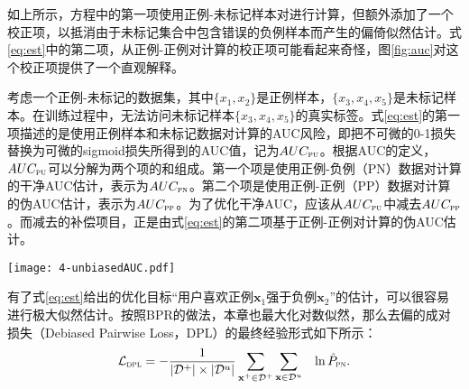 如上所示，方程中的第一项使用正例-未标记样本对进行计算，但额外添加了一个校正项，以抵消由于未标记集合中包含错误的负例样本而产生的偏倚似然估计。式\eqref{eq:est}中的第二项，从正例-正例对计算的校正项可能看起来奇怪，图\ref{fig:auc}对这个校正项提供了一个直观解释。

考虑一个正例-未标记的数据集，其中$\{x_1, x_2\}$是正例样本，$\{x_3, x_4, x_5\}$是未标记样本。在训练过程中，无法访问未标记样本$\{x_3, x_4, x_5\}$的真实标签。式\eqref{eq:est}的第一项描述的是使用正例样本和未标记数据对计算的AUC风险，即把不可微的0-1损失替换为可微的\textsf{sigmoid}损失所得到的AUC值，记为$AUC_\textsc{pu}$。根据AUC的定义，$AUC_\textsc{pu}$可以分解为两个项的和组成。第一个项是使用正例-负例（PN）数据对计算的干净AUC估计，表示为$AUC_\textsc{pn}$。第二个项是使用正例-正例（PP）数据对计算的伪AUC估计，表示为$AUC_\textsc{pp}$。为了优化干净AUC，应该从$AUC_\textsc{pu}$中减去$AUC_\textsc{pp}$。而减去的补偿项目，正是由式\eqref{eq:est}的第二项基于正例-正例对计算的伪AUC估计。

\begin{figure*}[h!]
	\centering
	\texttt{[image: 4-unbiasedAUC.pdf]}
	\caption{去偏成对损失的示意图} 
	\label{fig:auc}
\end{figure*}
有了式\eqref{eq:est}给出的优化目标“用户喜欢正例$\mathbf{x}_1$强于负例$\mathbf{x}_2$”的估计，可以很容易进行极大似然估计。按照BPR的做法，本章也最大化对数似然，那么去偏的成对损失（Debiased Pairwise Loss，DPL）的最终经验形式如下所示：
\begin{eqnarray}\label{eq:dpl}
	\mathcal{L}_\textsc{dpl}=- \frac{1}{|\mathcal{D}^+|\times |\mathcal{D}^u|} \sum_{\mathbf{x}^+ \in \mathcal{D}^+}\sum_{\mathbf{x} \in \mathcal{D}^u} && \ln \hat{P}_\textsc{pn}.
\end{eqnarray}

